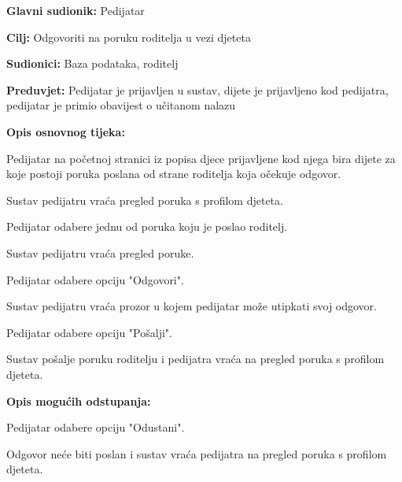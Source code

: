 					\noindent {}
					\begin{packed_item}
						
						\item \textbf{Glavni sudionik: }Pedijatar
						\item  \textbf{Cilj:} Odgovoriti na poruku roditelja u vezi djeteta
						\item  \textbf{Sudionici:} Baza podataka, roditelj
						\item  \textbf{Preduvjet:} Pedijatar je prijavljen u sustav, dijete je prijavljeno kod pedijatra, pedijatar je primio obavijest o učitanom nalazu
						\item  \textbf{Opis osnovnog tijeka:}
						
						\item[] \begin{packed_enum}
							
							\item Pedijatar na početnoj stranici iz popisa djece prijavljene kod njega bira dijete za koje postoji poruka poslana od strane roditelja koja očekuje odgovor.
							\item Sustav pedijatru vraća pregled poruka s profilom djeteta.
							\item Pedijatar odabere jednu od poruka koju je poslao roditelj.
							\item Sustav pedijatru vraća pregled poruke.
							\item Pedijatar odabere opciju "Odgovori".
							\item Sustav pedijatru vraća prozor u kojem pedijatar može utipkati svoj odgovor.
							\item Pedijatar odabere opciju "Pošalji".
							\item Sustav pošalje poruku roditelju i pedijatra vraća na pregled poruka s profilom djeteta.
						\end{packed_enum}
						
						\item  \textbf{Opis mogućih odstupanja:}
						
						\item[] \begin{packed_item}
							
							\item[7.a] Pedijatar odabere opciju "Odustani".
							\item[] \begin{packed_enum}
								
								\item Odgovor neće biti poslan i sustav vraća pedijatra na pregled poruka s profilom djeteta.
							\end{packed_enum}
							
							
						\end{packed_item}
						
						
					\end{packed_item}
					
